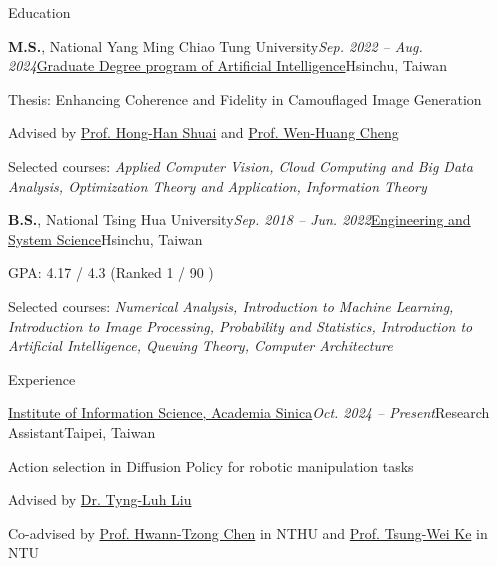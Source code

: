 \documentclass[11pt]{resume} %
\begin{document}
\vspace{-5pt}
\begin{rSection}{\Large Education}

\begin{rSubsection}{\large\textbf{M.S.}, National Yang Ming Chiao Tung University}{\textit{Sep. 2022 -- Aug. 2024}}{\href{https://aigp.ece.nycu.edu.tw/}{Graduate Degree program of Artificial Intelligence}}{Hsinchu, Taiwan}
\item Thesis: Enhancing Coherence and Fidelity in Camouflaged Image Generation
\item Advised by 
\href{https://basiclab.lab.nycu.edu.tw/}{Prof. Hong-Han Shuai} and \href{https://www.csie.ntu.edu.tw/~wenhuang/}{Prof. Wen-Huang Cheng}
\item Selected courses: \textit{Applied Computer Vision, Cloud Computing and Big Data Analysis, Optimization Theory and Application, Information Theory}
\end{rSubsection}
\begin{rSubsection}{\large\textbf{B.S.}, National Tsing Hua University}{\textit{Sep. 2018 -- Jun. 2022}}{\href{https://ess.site.nthu.edu.tw/}{Engineering and System Science}}{Hsinchu, Taiwan}
\item GPA: 4.17 / 4.3 (Ranked 1 / 90 )
\item Selected courses: \textit{Numerical Analysis, Introduction to Machine Learning, Introduction to Image Processing, Probability and Statistics, Introduction to Artificial Intelligence, Queuing Theory, Computer Architecture} 
\end{rSubsection}
\end{rSection}

\begin{rSection}{\Large Experience}

\begin{rSubsection}{\href{https://www.iis.sinica.edu.tw/zh/index.html}{\large Institute of Information Science, Academia Sinica}}{\textit{Oct. 2024 -- Present}}{Research Assistant}{Taipei, Taiwan}
  \item Action selection in Diffusion Policy for robotic manipulation tasks
  \item Advised by \href{https://homepage.iis.sinica.edu.tw/~liutyng/}{Dr. Tyng-Luh Liu}
  \item Co-advised by \href{https://htchen.github.io/}{Prof. Hwann-Tzong Chen} in NTHU and \href{https://twke18.github.io/}{Prof. Tsung-Wei Ke} in NTU
\end{rSubsection}

\end{rSection}
\end{document}
